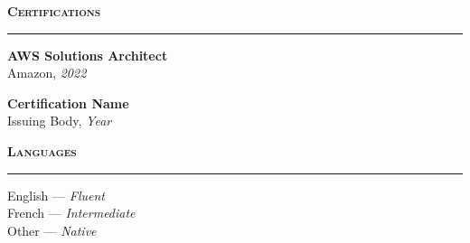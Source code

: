 \documentclass[10pt, a4paper]{article}
\newcommand{\sideheading}[1]{%
  \vspace{10pt}%
  {\small\textsc{\textbf{#1}}}\\[-2pt]%
  \rule{\linewidth}{0.3pt}%
  \vspace{4pt}%
}
\begin{document}
\begin{minipage}[t]{0.30\textwidth}
  \sideheading{Certifications}

  {\small
    \textbf{AWS Solutions Architect} \\
    Amazon, \textit{2022}

    \vspace{5pt}
    \textbf{Certification Name} \\
    Issuing Body, \textit{Year}
  }

  \sideheading{Languages}

  {\small
    English --- \textit{Fluent} \\
    French --- \textit{Intermediate} \\
    Other --- \textit{Native}
  }

\end{minipage}%
%
\hspace{0.03\textwidth}%
%
\end{document}
